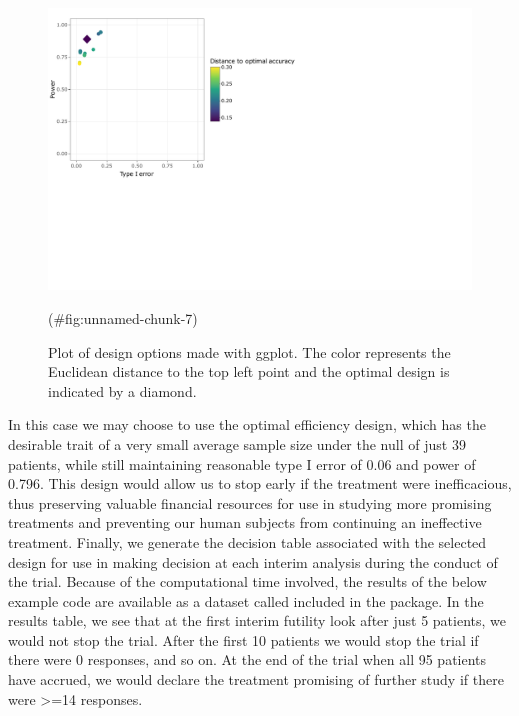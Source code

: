 \begin{Schunk}
\begin{figure}
\includegraphics{zabor-hobbs-kane_files/figure-latex/unnamed-chunk-7-1} \caption[Plot of design options made with ggplot]{Plot of design options made with ggplot. The color represents the Euclidean distance to the top left point and the optimal design is indicated by a diamond.}(\#fig:unnamed-chunk-7)
\end{figure}
\end{Schunk}

In this case we may choose to use the optimal efficiency design, which
has the desirable trait of a very small average sample size under the
null of just 39 patients, while still maintaining reasonable type I
error of 0.06 and power of 0.796. This design would allow us to stop
early if the treatment were inefficacious, thus preserving valuable
financial resources for use in studying more promising treatments and
preventing our human subjects from continuing an ineffective treatment.
Finally, we generate the decision table associated with the selected
design for use in making decision at each interim analysis during the
conduct of the trial. Because of the computational time involved, the
results of the below example code are available as a dataset called
 included in the  package.
In the results table, we see that at the first interim futility look
after just 5 patients, we would not stop the trial. After the first 10
patients we would stop the trial if there were 0 responses, and so on.
At the end of the trial when all 95 patients have accrued, we would
declare the treatment promising of further study if there were
\textgreater=14 responses.

